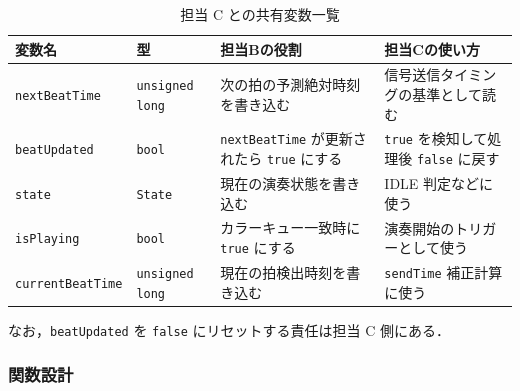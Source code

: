 \begin{table}[H]
\centering
\caption{担当 C との共有変数一覧}
\begin{tabular}{p{3.5cm}p{2.5cm}p{4cm}p{4cm}}
\hline
\textbf{変数名} & \textbf{型} & \textbf{担当Bの役割} & \textbf{担当Cの使い方} \\
\hline
\texttt{nextBeatTime} & \texttt{unsigned long} &
次の拍の予測絶対時刻を書き込む & 信号送信タイミングの基準として読む \\
\hline
\texttt{beatUpdated} & \texttt{bool} &
\texttt{nextBeatTime} が更新されたら \texttt{true} にする &
\texttt{true} を検知して処理後 \texttt{false} に戻す \\
\hline
\texttt{state} & \texttt{State} &
現在の演奏状態を書き込む &
IDLE 判定などに使う \\
\hline
\texttt{isPlaying} & \texttt{bool} &
カラーキュー一致時に \texttt{true} にする &
演奏開始のトリガーとして使う \\
\hline
\texttt{currentBeatTime} & \texttt{unsigned long} &
現在の拍検出時刻を書き込む &
\texttt{sendTime} 補正計算に使う \\
\hline
\end{tabular}
\end{table}

なお，\texttt{beatUpdated} を \texttt{false} にリセットする責任は担当 C 側にある．

\subsubsection{関数設計}

